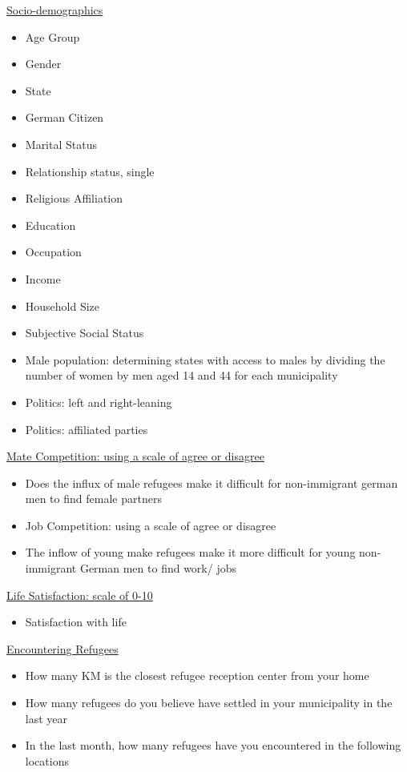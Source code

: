 \documentclass[
]{article}
\providecommand{\tightlist}{%
  \setlength{\itemsep}{0pt}\setlength{\parskip}{0pt}}\usepackage{longtable,booktabs,array}
\begin{document}
\uline{Socio-demographics}

\begin{itemize}
\tightlist
\item
  Age Group
\item
  Gender
\item
  State
\item
  German Citizen
\item
  Marital Status
\item
  Relationship status, single
\item
  Religious Affiliation
\item
  Education
\item
  Occupation
\item
  Income
\item
  Household Size
\item
  Subjective Social Status
\item
  Male population: determining states with access to males by dividing
  the number of women by men aged 14 and 44 for each municipality
\item
  Politics: left and right-leaning
\item
  Politics: affiliated parties
\end{itemize}

\uline{Mate Competition: using a scale of agree or disagree}

\begin{itemize}
\tightlist
\item
  Does the influx of male refugees make it difficult for non-immigrant
  german men to find female partners
\item
  Job Competition: using a scale of agree or disagree
\item
  The inflow of young make refugees make it more difficult for young
  non-immigrant German men to find work/ jobs
\end{itemize}

\uline{Life Satisfaction: scale of 0-10}

\begin{itemize}
\tightlist
\item
  Satisfaction with life
\end{itemize}

\uline{Encountering Refugees}

\begin{itemize}
\item
  How many KM is the closest refugee reception center from your home
\item
  How many refugees do you believe have settled in your municipality in
  the last year
\item
  In the last month, how many refugees have you encountered in the
  following locations
\end{itemize}
\end{document}
